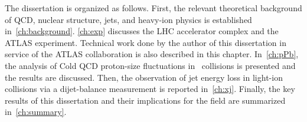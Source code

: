The dissertation is organized as follows.
First, the relevant theoretical background of QCD, nuclear structure, jets, and heavy-ion physics is established in~\ref{ch:background}.
\ref{ch:exp} discusses the LHC accelerator complex and the ATLAS experiment.
Technical work done by the author of this dissertation in service of the ATLAS collaboration is also described in this chapter.
In~\ref{ch:pPb}, the analysis of Cold QCD proton-size fluctuations in \pxPb\ collisions is presented and the results are discussed.
Then, the observation of jet energy loss in light-ion collisions via a dijet-balance measurement is reported in~\ref{ch:xj}.
Finally, the key results of this dissertation and their implications for the field are summarized in~\ref{ch:summary}.
